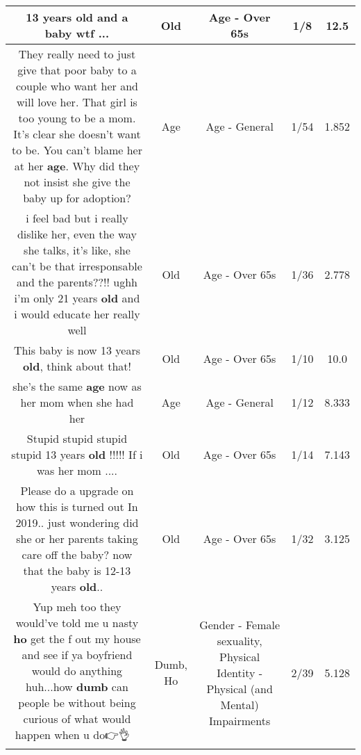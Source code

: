 \documentclass[11pt]{article}
\newlength\mylength
\begin{document}
\begin{center}
\begin{longtable}{|C{.65\mylength}|C{.30\mylength}|C{.12\mylength}|C{.12\mylength}|C{.12\mylength}|}
  \small 13 years \textbf{old} and a baby wtf ...\normalsize   & Old & Age - Over 65s & 1/8 & 12.5 \\  \hline
  \small They really need to just give that poor baby to a couple who want her and will love her.  That girl is too young to be a mom.  It's clear she doesn't want to be.  You can't blame her at her \textbf{age}.  Why did they not insist she give the baby up for adoption?\normalsize   & Age & Age - General & 1/54 & 1.852 \\  \hline
  \small i feel bad but i really dislike her, even the way she talks, it's like, she can't be that irresponsable and the parents??!! ughh i'm only 21 years \textbf{old} and i would educate her really well\normalsize   & Old & Age - Over 65s & 1/36 & 2.778 \\  \hline
  \small This baby is now 13 years \textbf{old}, think about that!\normalsize   & Old & Age - Over 65s & 1/10 & 10.0 \\  \hline
  \small she's the same \textbf{age} now as her mom when she had her\normalsize   & Age & Age - General & 1/12 & 8.333 \\  \hline
  \small Stupid stupid stupid stupid 13 years \textbf{old} !!!!! If i was her mom ....\normalsize   & Old & Age - Over 65s & 1/14 & 7.143 \\  \hline
  \small Please do a upgrade on how this is turned out In 2019.. just wondering did she or her parents taking care off the baby? now that the baby is 12-13 years \textbf{old}..\normalsize   & Old & Age - Over 65s & 1/32 & 3.125 \\  \hline
  \small Yup meh too they would've told me u nasty \textbf{ho} get the f out my house and see if ya boyfriend would do anything huh...how \textbf{dumb} can people be without being curious of what would happen when u do👉👌🤦🤦🤦\normalsize   & Dumb, Ho & Gender - Female sexuality, Physical Identity - Physical (and Mental) Impairments & 2/39 & 5.128 \\  \hline

\end{longtable}
\end{center}
\end{document}
